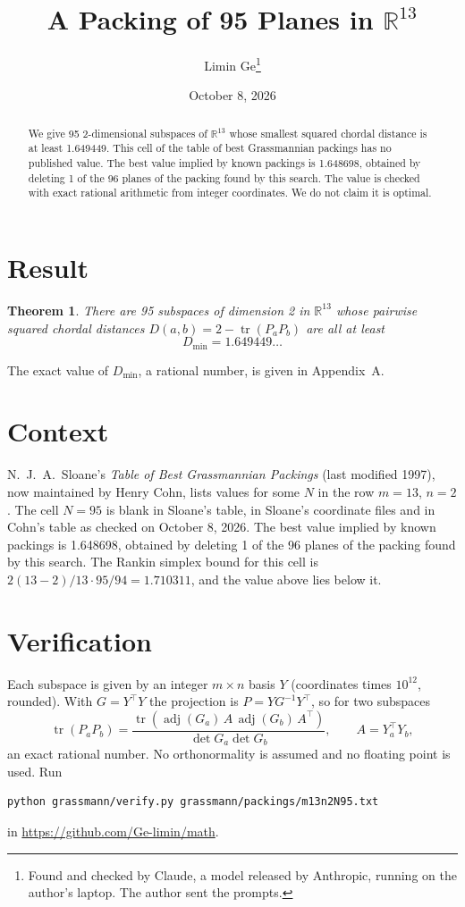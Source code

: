 \documentclass[11pt,a4paper]{article}
\title{A Packing of 95 Planes in $\mathbb{R}^{13}$}
\author{Limin Ge\thanks{Found and checked by Claude, a model released by Anthropic, running on the author's laptop. The author sent the prompts.}}
\date{October 8, 2026}
\newtheorem*{theorem}{Theorem}
\begin{document}
\maketitle
\begin{abstract}
We give 95 2-dimensional subspaces of $\mathbb{R}^{13}$ whose smallest squared chordal distance is at least 1.649449. This cell of the table of best Grassmannian packings has no published value. The best value implied by known packings is 1.648698, obtained by deleting 1 of the 96 planes of the packing found by this search. The value is checked with exact rational arithmetic from integer coordinates. We do not claim it is optimal.
\end{abstract}

\section{Result}
\begin{theorem}
There are 95 subspaces of dimension 2 in $\mathbb{R}^{13}$ whose pairwise squared chordal distances $D(a,b) = 2 - \operatorname{tr}(P_aP_b)$ are all at least
\[ D_{\min} = 1.649449\ldots \]
\end{theorem}
The exact value of $D_{\min}$, a rational number, is given in Appendix~A.


\section{Context}
N.~J.~A.~Sloane's \emph{Table of Best Grassmannian Packings} (last modified 1997), now maintained by Henry Cohn, lists values for some $N$ in the row $m=13$, $n=2$. The cell $N=95$ is blank in Sloane's table, in Sloane's coordinate files and in Cohn's table as checked on October 8, 2026. The best value implied by known packings is 1.648698, obtained by deleting 1 of the 96 planes of the packing found by this search. The Rankin simplex bound for this cell is $2(13-2)/13\cdot 95/94 = 1.710311$, and the value above lies below it.


\section{Verification}
Each subspace is given by an integer $m\times n$ basis $Y$ (coordinates times $10^{12}$, rounded). With $G=Y^\top Y$ the projection is $P=YG^{-1}Y^\top$, so for two subspaces
\[ \operatorname{tr}(P_aP_b)=\frac{\operatorname{tr}(\operatorname{adj}(G_a)\,A\,\operatorname{adj}(G_b)\,A^\top)}{\det G_a\det G_b},\qquad A=Y_a^\top Y_b, \]
an exact rational number. No orthonormality is assumed and no floating point is used. Run
\begin{verbatim}
python grassmann/verify.py grassmann/packings/m13n2N95.txt
\end{verbatim}
in \url{https://github.com/Ge-limin/math}.
\end{document}
